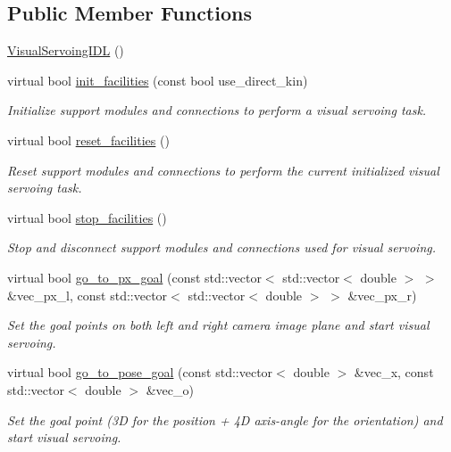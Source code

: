 \subsection*{Public Member Functions}
\begin{DoxyCompactItemize}
\item 
\hyperlink{classVisualServoingIDL_adff6d75dfaede0453d02b6f017e9e977}{Visual\+Servoing\+I\+DL} ()
\item 
virtual bool \hyperlink{classVisualServoingIDL_aae4ee4c07b50956396fd59bbb00fd9c7}{init\+\_\+facilities} (const bool use\+\_\+direct\+\_\+kin)
\begin{DoxyCompactList}\small\item\em Initialize support modules and connections to perform a visual servoing task. \end{DoxyCompactList}\item 
virtual bool \hyperlink{classVisualServoingIDL_a23929f03db99f80426a859cdad68e48c}{reset\+\_\+facilities} ()
\begin{DoxyCompactList}\small\item\em Reset support modules and connections to perform the current initialized visual servoing task. \end{DoxyCompactList}\item 
virtual bool \hyperlink{classVisualServoingIDL_a777cc1a83b3c0ae3dd86e36a0298970e}{stop\+\_\+facilities} ()
\begin{DoxyCompactList}\small\item\em Stop and disconnect support modules and connections used for visual servoing. \end{DoxyCompactList}\item 
virtual bool \hyperlink{classVisualServoingIDL_a75929f915651161c43ed032e9f69a361}{go\+\_\+to\+\_\+px\+\_\+goal} (const std\+::vector$<$ std\+::vector$<$ double $>$ $>$ \&vec\+\_\+px\+\_\+l, const std\+::vector$<$ std\+::vector$<$ double $>$ $>$ \&vec\+\_\+px\+\_\+r)
\begin{DoxyCompactList}\small\item\em Set the goal points on both left and right camera image plane and start visual servoing. \end{DoxyCompactList}\item 
virtual bool \hyperlink{classVisualServoingIDL_a697368ff5a1b3f16069d1d10f25ca888}{go\+\_\+to\+\_\+pose\+\_\+goal} (const std\+::vector$<$ double $>$ \&vec\+\_\+x, const std\+::vector$<$ double $>$ \&vec\+\_\+o)
\begin{DoxyCompactList}\small\item\em Set the goal point (3D for the position + 4D axis-\/angle for the orientation) and start visual servoing. \end{DoxyCompactList}\item 

\end{DoxyCompactItemize}

